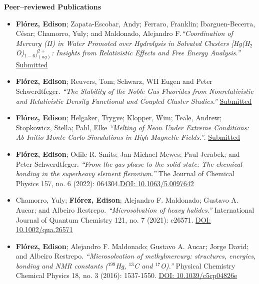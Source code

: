 {\bf\Large Peer--reviewed \textcolor{my_blue}{Publications}}\\ \vspace*{-6mm}

\begin{itemize}
    \small

    \item \textbf{Flórez, Edison}; Zapata-Escobar, Andy; Ferraro, Franklin; Ibarguen-Becerra, César; Chamorro, Yuly; and Maldonado, Alejandro F.\emph{``Coordination of Mercury (II) in Water Promoted over Hydrolysis in Solvated Clusters [Hg(H$_2$O)$_{1-6}$]$^{2+}_{(aq)}$: Insights from Relativistic Effects and Free Energy Analysis.''} \underline{Submitted}

    \item \textbf{Flórez, Edison}; Reuvers, Tom; Schwarz, WH Eugen and Peter Schwerdtfeger. \emph{``The Stability of the Noble Gas Fluorides from Nonrelativistic and Relativistic Density Functional and Coupled Cluster Studies.''} \underline{Submitted}

    \item \textbf{Flórez, Edison}; Helgaker, Trygve; Klopper, Wim; Teale, Andrew; Stopkowicz, Stella; Pahl, Elke \emph{``Melting of Neon Under Extreme Conditions: Ab Initio Monte Carlo Simulations in High Magnetic Fields.''}. \underline{Submitted}

    \item \textbf{Flórez, Edison}; Odile R. Smits; Jan-Michael Mewes; Paul Jerabek; and Peter Schwerdtfeger. \emph{``From the gas phase to the solid state: The chemical bonding in the superheavy element flerovium.''} The Journal of Chemical Physics 157, no. 6 (2022): 064304.\underline{DOI: 10.1063/5.0097642}

    \item Chamorro, Yuly;  \textbf{Flórez, Edison}; Alejandro F. Maldonado; Gustavo A. Aucar; and Albeiro Restrepo. \emph{``Microsolvation of heavy halides.''} International Journal of Quantum Chemistry 121, no. 7 (2021): e26571. \underline{DOI: 10.1002/qua.26571}

    \item \textbf{Flórez, Edison}; Alejandro F. Maldonado; Gustavo A. Aucar; Jorge David; and Albeiro Restrepo. \emph{``Microsolvation of methylmercury: structures, energies, bonding and NMR constants ($^{199}$Hg, $^{13}$C and $^{17}$O).''} Physical Chemistry Chemical Physics 18, no. 3 (2016): 1537-1550. \underline{DOI: 10.1039/c5cp04826e}

\end{itemize}


